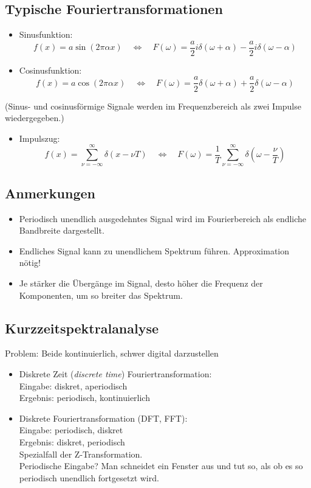 \subsection{Typische Fouriertransformationen}
\begin{itemize}
\item Sinusfunktion: $$f(x) = a \sin(2 \pi \alpha x) \quad \Leftrightarrow \quad F(\omega) = \frac{a}{2}i \delta(\omega + \alpha) - \frac{a}{2}i \delta(\omega - \alpha)$$
\item Cosinusfunktion: $$f(x) = a \cos(2 \pi \alpha x) \quad \Leftrightarrow \quad F(\omega) = \frac{a}{2} \delta(\omega + \alpha) + \frac{a}{2} \delta(\omega - \alpha)$$
\end{itemize}
(Sinus- und cosinusförmige Signale werden im Frequenzbereich als zwei Impulse wiedergegeben.)
\begin{itemize}
\item Impulszug: $$f(x) = \sum\limits_{\nu = -\infty}^{\infty} \delta(x - \nu T) \quad \Leftrightarrow \quad F(\omega) = \frac{1}{T} \sum\limits_{\nu = -\infty}^{\infty} \delta(\omega - \frac{\nu}{T})$$
\end{itemize}

\subsection{Anmerkungen}
\begin{itemize}
\item Periodisch unendlich ausgedehntes Signal wird im Fourierbereich als endliche Bandbreite dargestellt.
\item Endliches Signal kann zu unendlichem Spektrum führen. Approximation nötig!
\item Je stärker die Übergänge im Signal, desto höher die Frequenz der Komponenten, um so breiter das Spektrum.
\end{itemize}


\subsection{Kurzzeitspektralanalyse}

Problem: Beide kontinuierlich, schwer digital darzustellen
\begin{itemize}
\item Diskrete Zeit (\textsl{discrete time}) Fouriertransformation: \\ Eingabe: diskret, aperiodisch \\ Ergebnis: periodisch, kontinuierlich
\item Diskrete Fouriertransformation (DFT, FFT): \\ Eingabe: periodisch, diskret \\ Ergebnis: diskret, periodisch \\ Spezialfall der Z-Transformation. \\ Periodische Eingabe? Man schneidet ein Fenster aus und tut so, als ob es so periodisch unendlich fortgesetzt wird.
\end{itemize}

